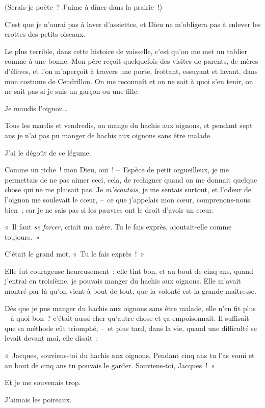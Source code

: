 \documentclass[french,twoside]{book} %
\begin{document}
(Serais-je poète ? J’aime à dîner dans la prairie !)\par
C’est que je n’aurai pas à laver d’assiettes, et Dieu ne m’obligera pas à enlever les crottes des petits oiseaux.\par
Le plus terrible, dans cette histoire de vaisselle, c’est qu’on me met un tablier comme à une bonne. Mon père reçoit quelquefois des visites de parents, de mères d’élèves, et l’on m’aperçoit à travers une porte, frottant, essuyant et lavant, dans mon costume de Cendrillon. On me reconnaît et on ne sait à quoi s’en tenir, on ne sait pas si je suis un garçon ou une fille.\par
\bigbreak
\noindent Je maudis l’oignon…\par
Tous les mardis et vendredis, on mange du hachis aux oignons, et pendant sept ans je n’ai pas pu manger de hachis aux oignons sans être malade.\par
J’ai le dégoût de ce légume.\par
Comme un riche ! mon Dieu, oui ! – Espèce de petit orgueilleux, je me permettais de ne pas aimer ceci, cela, de rechigner quand on me donnait quelque chose qui ne me plaisait pas. Je \emph{m’écoutais}, je me sentais surtout, et l’odeur de l’oignon me soulevait le cœur, – ce que j’appelais mon cœur, comprenons-nous bien ; car je ne sais pas si les pauvres ont le droit d’avoir un cœur.\par
« Il faut \emph{se forcer}, criait ma mère. Tu le fais exprès, ajoutait-elle comme toujours. »\par
\bigbreak
\noindent C’était le grand mot. « Tu le fais exprès ! »\par
Elle fut courageuse heureusement : elle tint bon, et au bout de cinq ans, quand j’entrai en troisième, je pouvais manger du hachis aux oignons. Elle m’avait montré par là qu’on vient à bout de tout, que la volonté est la grande maîtresse.\par
Dès que je pus manger du hachis aux oignons sans être malade, elle n’en fit plus – à quoi bon ? c’était aussi cher qu’autre chose et ça empoisonnait. Il suffisait que sa méthode eût triomphé, – et plus tard, dans la vie, quand une difficulté se levait devant moi, elle disait :\par
« Jacques, souviens-toi du hachis aux oignons. Pendant cinq ans tu l’as vomi et au bout de cinq ans tu pouvais le garder. Souviens-toi, Jacques ! »\par
Et je me souvenais trop.\par
\bigbreak
\noindent J’aimais les poireaux.\par
\end{document}

